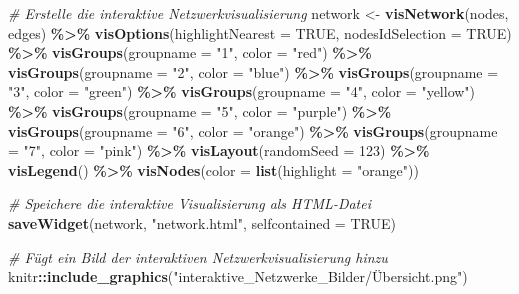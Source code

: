 \documentclass[
]{article}
\newenvironment{Shaded}{\begin{snugshade}}{\end{snugshade}}
\newcommand{\AttributeTok}[1]{\textcolor[rgb]{0.13,0.29,0.53}{#1}}
\newcommand{\CommentTok}[1]{\textcolor[rgb]{0.56,0.35,0.01}{\textit{#1}}}
\newcommand{\ConstantTok}[1]{\textcolor[rgb]{0.56,0.35,0.01}{#1}}
\newcommand{\DecValTok}[1]{\textcolor[rgb]{0.00,0.00,0.81}{#1}}
\newcommand{\FunctionTok}[1]{\textcolor[rgb]{0.13,0.29,0.53}{\textbf{#1}}}
\newcommand{\NormalTok}[1]{#1}
\newcommand{\OtherTok}[1]{\textcolor[rgb]{0.56,0.35,0.01}{#1}}
\newcommand{\SpecialCharTok}[1]{\textcolor[rgb]{0.81,0.36,0.00}{\textbf{#1}}}
\newcommand{\StringTok}[1]{\textcolor[rgb]{0.31,0.60,0.02}{#1}}
\begin{document}
\begin{Shaded}
\begin{Highlighting}[]
\CommentTok{\# Erstelle die interaktive Netzwerkvisualisierung}
\NormalTok{network }\OtherTok{\textless{}{-}} \FunctionTok{visNetwork}\NormalTok{(nodes, edges) }\SpecialCharTok{\%\textgreater{}\%}
  \FunctionTok{visOptions}\NormalTok{(}\AttributeTok{highlightNearest =} \ConstantTok{TRUE}\NormalTok{, }\AttributeTok{nodesIdSelection =} \ConstantTok{TRUE}\NormalTok{) }\SpecialCharTok{\%\textgreater{}\%}
  \FunctionTok{visGroups}\NormalTok{(}\AttributeTok{groupname =} \StringTok{"1"}\NormalTok{, }\AttributeTok{color =} \StringTok{"red"}\NormalTok{) }\SpecialCharTok{\%\textgreater{}\%}
  \FunctionTok{visGroups}\NormalTok{(}\AttributeTok{groupname =} \StringTok{"2"}\NormalTok{, }\AttributeTok{color =} \StringTok{"blue"}\NormalTok{) }\SpecialCharTok{\%\textgreater{}\%}
  \FunctionTok{visGroups}\NormalTok{(}\AttributeTok{groupname =} \StringTok{"3"}\NormalTok{, }\AttributeTok{color =} \StringTok{"green"}\NormalTok{) }\SpecialCharTok{\%\textgreater{}\%}
  \FunctionTok{visGroups}\NormalTok{(}\AttributeTok{groupname =} \StringTok{"4"}\NormalTok{, }\AttributeTok{color =} \StringTok{"yellow"}\NormalTok{) }\SpecialCharTok{\%\textgreater{}\%}
  \FunctionTok{visGroups}\NormalTok{(}\AttributeTok{groupname =} \StringTok{"5"}\NormalTok{, }\AttributeTok{color =} \StringTok{"purple"}\NormalTok{) }\SpecialCharTok{\%\textgreater{}\%}
  \FunctionTok{visGroups}\NormalTok{(}\AttributeTok{groupname =} \StringTok{"6"}\NormalTok{, }\AttributeTok{color =} \StringTok{"orange"}\NormalTok{) }\SpecialCharTok{\%\textgreater{}\%}
  \FunctionTok{visGroups}\NormalTok{(}\AttributeTok{groupname =} \StringTok{"7"}\NormalTok{, }\AttributeTok{color =} \StringTok{"pink"}\NormalTok{) }\SpecialCharTok{\%\textgreater{}\%}
  \FunctionTok{visLayout}\NormalTok{(}\AttributeTok{randomSeed =} \DecValTok{123}\NormalTok{) }\SpecialCharTok{\%\textgreater{}\%}
  \FunctionTok{visLegend}\NormalTok{() }\SpecialCharTok{\%\textgreater{}\%}
  \FunctionTok{visNodes}\NormalTok{(}\AttributeTok{color =} \FunctionTok{list}\NormalTok{(}\AttributeTok{highlight =} \StringTok{"orange"}\NormalTok{))}

\CommentTok{\# Speichere die interaktive Visualisierung als HTML{-}Datei}
\FunctionTok{saveWidget}\NormalTok{(network, }\StringTok{"network.html"}\NormalTok{, }\AttributeTok{selfcontained =} \ConstantTok{TRUE}\NormalTok{)}

\CommentTok{\# Fügt ein Bild der interaktiven Netzwerkvisualisierung hinzu}
\NormalTok{knitr}\SpecialCharTok{::}\FunctionTok{include\_graphics}\NormalTok{(}\StringTok{"interaktive\_Netzwerke\_Bilder/Übersicht.png"}\NormalTok{)}
\end{Highlighting}
\end{Shaded}
\end{document}
